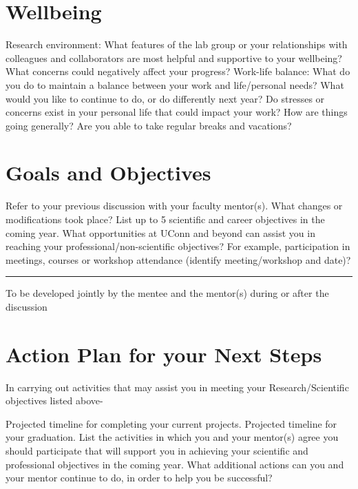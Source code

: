 \documentclass[answers,12pt]{exam}
\begin{document}
\section{Wellbeing}\label{wellbeing}
\begin{questions}
\question
\filbreak Research environment: What features of the lab group or your relationships
  with colleagues and collaborators are most helpful and supportive to your
  wellbeing? What concerns could negatively affect your progress?  \tbox{}
\question
\filbreak Work-life balance: What do you do to maintain a balance between your work
  and life/personal needs?  What would you like to continue to do, or do
  differently next year?  \tbox{}
\question
\filbreak Do stresses or concerns exist in your personal life that could impact your
  work? How are things going generally? Are you able to take regular breaks and
  vacations?  \tbox{}
\end{questions}

\section{Goals and Objectives}\label{goals}
\begin{questions}
\question
\filbreak Refer to your previous discussion with your faculty mentor(s).  What
  changes or modifications took place?  \tbox{}
\question
\filbreak List up to 5 scientific and career objectives in the coming year.  \tbox{}
\question
\filbreak What opportunities at UConn and beyond can assist you in reaching your
  professional/non-scientific objectives?  For example, participation in
  meetings, courses or workshop attendance (identify meeting/workshop and date)?
  \tbox{}
\end{questions}

\noindent\rule{\linewidth}{0.4pt}

\noindent
To be developed jointly by the mentee and the mentor(s) during or after the
discussion

\section{Action Plan for your Next Steps}\label{next}
In carrying out activities that may assist you in meeting your
Research/Scientific objectives listed above-
\begin{questions}
\question
\filbreak Projected timeline for completing your current projects. \tbox{}
\question
\filbreak Projected timeline for your graduation.  \tbox{}
\question
\filbreak List the activities in which you and your mentor(s) agree you should
  participate that will support you in achieving your scientific and
  professional objectives in the coming year.  \tbox{}
\question
\filbreak What additional actions can you and your mentor continue to do, in order
  to help you be successful?  \tbox{}
\end{questions}
\end{document}
